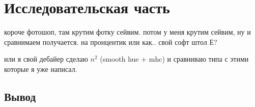 \chapter{Исследовательская часть}

короче фотошоп, там крутим фотку сейвим. потом у меня крутим сейвим, ну и сравнимаем получается.
на пронцентик или как..
свой софт штол Е?

или я свой дебайер сделаю $n^2$ (smooth hue + mhc)
и сравниваю типа с этими которые я уже написал.

\section*{Вывод}

